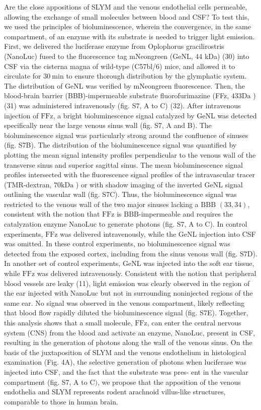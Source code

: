 Are the close appositions of SLYM and the venous endothelial cells permeable, allowing the exchange of small molecules between blood and CSF? To test this, we used the principles of bioluminescence, wherein the convergence, in the same compartment, of an enzyme with its substrate is needed to trigger light emission. First, we delivered the luciferase enzyme from Oplophorus gracilirostris (NanoLuc) fused to the fluorescence tag mNeongreen (GeNL, 44 kDa) (30) into CSF via the cisterna magna of wild-type (C57bl/6) mice, and allowed it to circulate for $30 \mathrm{~min}$ to ensure thorough distribution by the glymphatic system. The distribution of GeNL was verified by mNeongreen fluorescence. Then, the blood-brain barrier (BBB)-impermeable substrate fluorofurimazine (FFz, $433 \mathrm{Da}$ ) (31) was administered intravenously (fig. S7, A to C) (32). After intravenous injection of $\mathrm{FFz}$, a bright bioluminescence signal catalyzed by GeNL was detected specifically near the large venous sinus wall (fig. S7, A and B). The bioluminescence signal was particularly strong around the confluence of sinuses (fig. S7B). The distribution of the bioluminescence signal was quantified by plotting the mean signal intensity profiles perpendicular to the venous wall of the transverse sinus and superior sagittal sinus. The mean bioluminescence signal profiles intersected with the fluorescence signal profiles of the intravascular tracer (TMR-dextran, $70 \mathrm{kDa}$ ) or with shadow imaging of the inverted GeNL signal outlining the vascular wall (fig. S7C). Thus, the bioluminescence signal was restricted to the venous wall of the two major sinuses lacking a $\mathrm{BBB}$ $(33,34)$, consistent with the notion that $\mathrm{FFz}$ is $\mathrm{BBB}$-impermeable and requires the catalyzation enzyme NanoLuc to generate photons (fig. S7, A to C). In control experiments, $\mathrm{FFz}$ was delivered intravenously, while the GeNL injection into CSF was omitted. In these control experiments, no bioluminescence signal was detected from the exposed cortex, including from the sinus venous wall (fig. S7D). In another set of control experiments, GeNL was injected into the soft ear tissue, while $\mathrm{FFz}$ was delivered intravenously. Consistent with the notion that peripheral blood vessels are leaky (11), light emission was clearly observed in the region of the ear injected with NanoLuc but not in surrounding noninjected regions of the same ear. No signal was observed in the venous compartment, likely reflecting that blood flow rapidly diluted the bioluminescence signal (fig. S7E). Together, this analysis shows that a small molecule, $\mathrm{FFz}$, can enter the central nervous system (CNS) from the blood and activate an enzyme, NanoLuc, present in CSF, resulting in the generation of photons along the wall of the venous sinus. On the basis of the juxtaposition of SLYM and the venous endothelium in histological examination (Fig. 4A), the selective generation of photons when luciferase was injected into CSF, and the fact that the substrate was pres- ent in the vascular compartment (fig. S7, A to $\mathrm{C})$, we propose that the apposition of the venous endothelia and SLYM represents rodent arachnoid villus-like structures, comparable to those in human brain.

